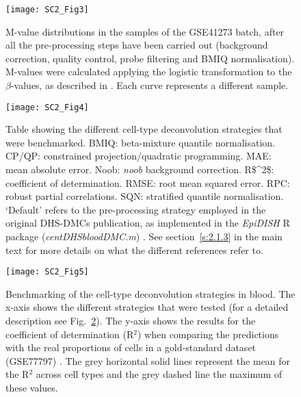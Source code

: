 \begin{figure}[htbp!] 
	\centering    
	\texttt{[image: SC2\_Fig3]}
	\caption[M-value distributions in the GSE41273 batch]{M-value distributions in the samples of the GSE41273 batch, after all the pre-processing steps have been carried out (background correction, quality control, probe filtering and BMIQ normalisation). M-values were calculated applying the logistic transformation to the $\beta$-values, as described in \citet{Du2010}. Each curve represents a different sample.}
	\label{fig:sc2_fig3}
\end{figure}

\begin{figure}[htbp!] 
	\centering    
	\texttt{[image: SC2\_Fig4]}
	\caption[Cell-type deconvolution strategies that were benchmarked]{Table showing the different cell-type deconvolution strategies that were benchmarked. BMIQ: beta-mixture quantile normalisation. \acrshort{CP/QP}: constrained projection/quadratic programming. \acrshort{MAE}: mean absolute error. Noob: \textit{noob} background correction.  \acrshort{R$^2$}: coefficient of determination. \acrshort{RMSE}: root mean squared error. \acrshort{RPC}: robust partial correlations. \acrshort{SQN}: stratified quantile normalisation. `Default' refers to the pre-processing strategy employed in the original DHS-DMCs publication, as implemented in the \textit{EpiDISH} R package (\textit{centDHSbloodDMC.m}) \citep{Teschendorff2017a,Teschendorff2017b}. See section~\ref{s:2.1.3} in the main text for more details on what the different references refer to.}
	\label{fig:sc2_fig4}
\end{figure}

\begin{figure}[htbp!] 
	\centering    
	\texttt{[image: SC2\_Fig5]}
	\caption[Benchmarking of the cell-type deconvolution strategies in blood: R$^2$]{Benchmarking of the cell-type deconvolution strategies in blood. The x-axis shows the different strategies that were tested (for a detailed description see Fig.~\ref{fig:sc2_fig4}). The y-axis shows the results for the coefficient of determination (R$^2$) when comparing the predictions with the real proportions of cells in a gold-standard dataset (GSE77797) \citep{Koestler2016}. The grey horizontal solid lines represent the mean for the R$^2$ across cell types and the grey dashed line the maximum of these values.}
	\label{fig:sc2_fig5}
\end{figure}

